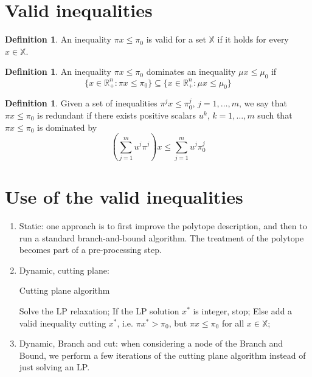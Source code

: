 \documentclass[11pt, openany]{report}
\newcommand{\R}{\mathbb{R}}
\theoremstyle{definition}
\newtheorem{definition}[thm]{Definition}
\begin{document}
\section{Valid inequalities}
\begin{definition}
    An inequality $\pi x \le \pi_0$ is valid for a set $\mathbb{X}$ if it holds for every $x\in \mathbb{X}$.
\end{definition}
\begin{definition}
    An inequality $\pi x\le \pi_0$ dominates an inequality $\mu x\le \mu_0$ if 
    \begin{equation}
        \{x\in \R_+^n :\pi x\le \pi_0\} \subseteq \{x\in\R_+^n :\mu x\le \mu_0\}
    \end{equation}
\end{definition}
\begin{definition}
    Given a set of inequalities $\pi^j x\le \pi_0^j$, $j=1,\dots,m$, we say that $\pi x\le \pi_0$ is redundant if there exists positive scalars $u^k$, $k=1,\dots,m$ such that $\pi x\le \pi_0$ is dominated by 
    \begin{equation}
        \left(\sum_{j=1}^m u^j \pi^j\right) x\le \sum_{j=1}^m u^j \pi_0^j
    \end{equation}
\end{definition}
\section{Use of the valid inequalities}
\begin{enumerate}
    \item Static: one approach is to first improve the polytope description, and then to run a standard branch-and-bound algorithm. The treatment of the polytope becomes part of a pre-processing step.
    \item Dynamic, cutting plane: 
    \begin{algorithm}[H]
        \caption{Cutting plane  algorithm}\label{algo:cutting}
        \begin{algorithmic}[1]
            \State Solve the LP relaxation;
            \State If the LP solution $x^*$ is integer, stop;
            \State Else add a valid inequality cutting $x^*$, i.e. $\pi x^*>\pi_0$, but $\pi x\le \pi_0$ for all $x\in \mathbb{X}$;
        \end{algorithmic}
    \end{algorithm}
    \item Dynamic, Branch and cut: when considering a node of the Branch and Bound, we perform a few iterations of the cutting plane algorithm instead of just solving an LP.
\end{enumerate}
\end{document}

